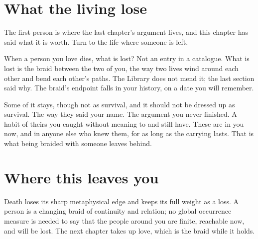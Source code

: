 \section*{What the living lose}

The first person is where the last chapter's argument lives, and this chapter has said what it is worth. Turn to the life where someone is left.

When a person you love dies, what is lost? Not an entry in a catalogue. What is lost is the braid between the two of you, the way two lives wind around each other and bend each other's paths. The Library does not mend it; the last section said why. The braid's endpoint falls in your history, on a date you will remember.

Some of it stays, though not as survival, and it should not be dressed up as survival. The way they said your name. The argument you never finished. A habit of theirs you caught without meaning to and still have. These are in you now, and in anyone else who knew them, for as long as the carrying lasts. That is what being braided with someone leaves behind.

\section*{Where this leaves you}

Death loses its sharp metaphysical edge and keeps its full weight as a loss. A person is a changing braid of continuity and relation; no global occurrence measure is needed to say that the people around you are finite, reachable now, and will be lost. The next chapter takes up love, which is the braid while it holds.

